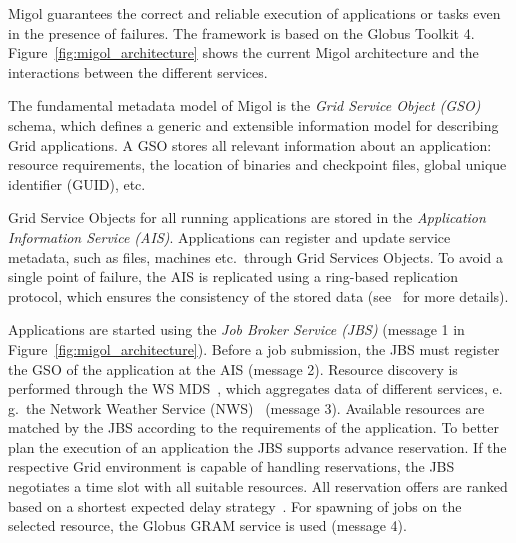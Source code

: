 \documentclass[times, 10pt,twocolumn]{article}
\begin{document}
Migol guarantees the correct and reliable exe\-cution of applications or tasks even in
the presence of  failures. The framework is based on the Globus Toolkit 4. 
Figure~\ref{fig:migol_architecture} shows the current Migol architecture and 
the interactions between the different services.

The fundamental metadata model of Migol is the \emph{Grid Service Object (GSO)} schema,
which defines a generic and extensible information model for
describing Grid applications.  
A GSO stores all relevant information about an application: resource requirements,
the location of binaries and checkpoint files, global unique identifier (GUID),
etc.

Grid Service Objects for all running applications are stored in 
the {\em Application Information Service (AIS)}. 
Applications can register and update service metadata, 
such as files, machines etc.\ through Grid Services Objects. 
To avoid a single point of failure, the AIS is replicated using a ring-based
replication protocol, which ensures  the consistency of the stored data
(see~\cite{Luckow:2008ys} for more details).

Applications are started using the {\em Job Broker Service (JBS)} (message 1 in 
Figure~\ref{fig:migol_architecture}). Before a job
submission, the JBS must register the GSO of the application at the AIS (message 2).
Resource discovery is performed through the WS MDS~\cite{schopf06},
which aggregates data of different services, e.\,g.\ the Network
Weather Service (NWS)~\cite{NWS99} (message 3).  Available resources are matched
by the JBS according to the requirements of the application. To better plan the execution of 
an application the JBS supports advance reservation. If the respective Grid environment is capable of handling reservations, the JBS negotiates 
a time slot with all suitable resources. All reservation offers are ranked based on a shortest expected
delay strategy~\cite{Jeske:2007wj}.  For spawning of jobs on the selected resource, the Globus GRAM service is used (message 4).
             
\end{document}
